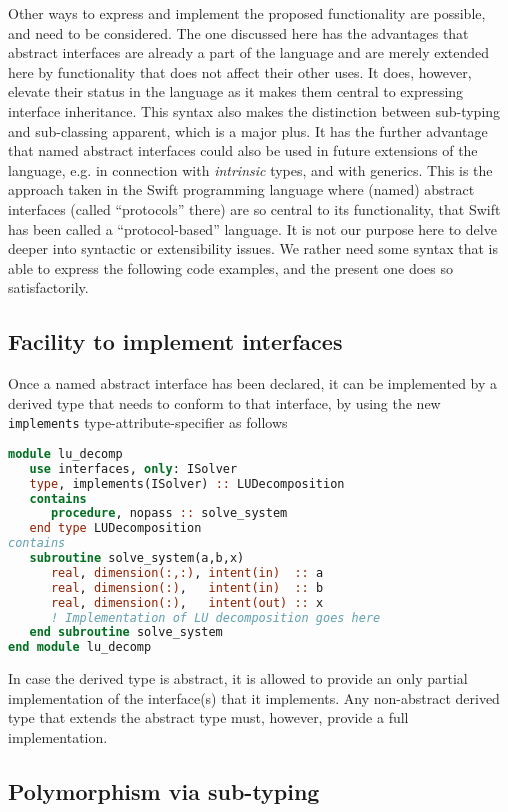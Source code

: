 \documentclass[11pt,oneside]{article}
\begin{document}
Other ways to express and implement the proposed functionality are
possible, and need to be considered. The one discussed here has the
advantages that abstract interfaces are already a part of the language
and are merely extended here by functionality that does not affect
their other uses. It does, however, elevate their status in the
language as it makes them central to expressing interface
inheritance. This syntax also makes the distinction between sub-typing
and sub-classing apparent, which is a major plus. It has the further
advantage that named abstract interfaces could also be used in future
extensions of the language, e.g. in connection with \emph{intrinsic}
types, and with generics. This is the approach taken in the Swift
programming language where (named) abstract interfaces (called
``protocols'' there) are so central to its functionality, that Swift
has been called a ``protocol-based'' language. It is not our purpose
here to delve deeper into syntactic or extensibility issues. We rather
need some syntax that is able to express the following code examples,
and the present one does so satisfactorily.


\subsection{Facility to implement interfaces}

Once a named abstract interface has been declared, it can be
implemented by a derived type that needs to conform to that interface,
by using the new \texttt{implements} type-attribute-specifier as
follows
\begin{lstlisting}[language=Fortran]
module lu_decomp
   use interfaces, only: ISolver
   type, implements(ISolver) :: LUDecomposition
   contains
      procedure, nopass :: solve_system
   end type LUDecomposition
contains
   subroutine solve_system(a,b,x)
      real, dimension(:,:), intent(in)  :: a
      real, dimension(:),   intent(in)  :: b
      real, dimension(:),   intent(out) :: x
      ! Implementation of LU decomposition goes here
   end subroutine solve_system   
end module lu_decomp
\end{lstlisting}
In case the derived type is abstract, it is allowed to provide an only
partial implementation of the interface(s) that it implements. Any
non-abstract derived type that extends the abstract type must,
however, provide a full implementation.

\subsection{Polymorphism via sub-typing}
\label{sect:declarations}
\end{document}
